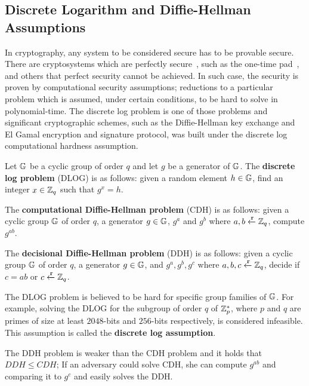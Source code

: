 \subsection[Discrete Logarithm and Diffie-Hellman Assumptions]{Discrete Logarithm and Diffie-Hellman Assumptions~\cite{Katz:2014:IMC:2700550, kiagias:crypto}}
\label{preliminaries:pub:dlog}

In cryptography, any system to be considered secure has to be provable secure. There are cryptosystems which are perfectly secure~\cite{shannon_otp}, such as the one-time pad~\cite{shannon_otp}, and others that perfect security cannot be achieved. In such case, the security is proven by computational security assumptions; reductions to a particular problem which is assumed, under certain conditions, to be hard to solve in polynomial-time. The discrete log problem is one of those problems and significant cryptographic schemes, such as the Diffie-Hellman key exchange and El Gamal encryption and signature protocol, was built under the discrete log computational hardness assumption.

\begin{dfn}
  Let $\mathbb{G}$ be a cyclic group of order $q$ and let $g$ be a generator of $\mathbb{G}$. The \textbf{discrete log problem} (DLOG) is as follows: given a random element $h \in \mathbb{G}$, find an integer $x \in \mathbb{Z}_q$ such that $g^{x} = h$.
\end{dfn}

\begin{dfn}
 The \textbf{computational Diffie-Hellman problem} (CDH) is as follows: given a cyclic group $\mathbb{G}$ of order $q$, a generator $g \in \mathbb{G}$, $g^{a}$ and $g^{b}$ where $a, b \xleftarrow{\mathtt{r}}{\mathbb{Z}_q}$, compute $g^{ab}$.
\end{dfn}

\begin{dfn}
 The \textbf{decisional Diffie-Hellman problem} (DDH) is as follows: given a cyclic group $\mathbb{G}$ of order $q$, a generator $g \in \mathbb{G}$, and $g^{a}, g^{b}, g^{c}$ where $a, b, c \xleftarrow{\mathtt{r}}{\mathbb{Z}_q}$, decide if $c = ab$ or $c \xleftarrow{\mathtt{r}}{\mathbb{Z}_q}$.
\end{dfn}

The DLOG problem is believed to be hard for specific group families of $\mathbb{G}$. For example, solving the DLOG for the subgroup of order $q$ of $\mathbb{Z}^{*}_{p}$, where $p$ and $q$ are primes of size at least $2048$-bits and $256$-bits respectively, is considered infeasible. This assumption is called the \textbf{discrete log assumption}.

The DDH problem is weaker than the CDH problem and it holds that $DDH \leq CDH$; If an adversary could solve CDH, she can compute $g^{ab}$ and comparing it to $g^{c}$ and easily solves the DDH.

